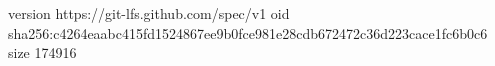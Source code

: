version https://git-lfs.github.com/spec/v1
oid sha256:c4264eaabc415fd1524867ee9b0fce981e28cdb672472c36d223cace1fc6b0c6
size 174916
